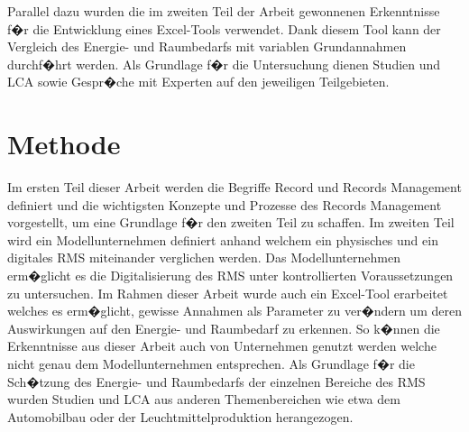 \documentclass[a4paper,twoside,10pt]{report}
\begin{document}
Parallel dazu wurden die im zweiten Teil der Arbeit gewonnenen Erkenntnisse f�r die Entwicklung eines Excel-Tools verwendet. Dank diesem Tool kann der Vergleich des Energie- und Raumbedarfs mit variablen Grundannahmen durchf�hrt werden. Als Grundlage f�r die Untersuchung dienen Studien und \ac{LCA} sowie Gespr�che mit Experten auf den jeweiligen Teilgebieten.

\acresetall
\chapter{Methode}\label{methodik}
Im ersten Teil dieser Arbeit werden die Begriffe Record und Records Management definiert und die wichtigsten Konzepte und Prozesse des Records Management vorgestellt, um eine Grundlage f�r den zweiten Teil zu schaffen. Im zweiten Teil wird ein Modellunternehmen definiert anhand welchem ein physisches und ein digitales \ac{RMS} miteinander verglichen werden. Das Modellunternehmen erm�glicht es die Digitalisierung des \ac{RMS} unter kontrollierten Voraussetzungen zu untersuchen. Im Rahmen dieser Arbeit wurde auch ein Excel-Tool erarbeitet welches es erm�glicht, gewisse Annahmen als Parameter zu ver�ndern um deren Auswirkungen auf den Energie- und Raumbedarf zu erkennen. So k�nnen die Erkenntnisse aus dieser Arbeit auch von Unternehmen genutzt werden welche nicht genau dem Modellunternehmen entsprechen. Als Grundlage f�r die Sch�tzung des Energie- und Raumbedarfs der einzelnen Bereiche des \ac{RMS} wurden Studien und \ac{LCA} aus anderen Themenbereichen wie etwa dem Automobilbau oder der Leuchtmittelproduktion herangezogen.

\end{document}

